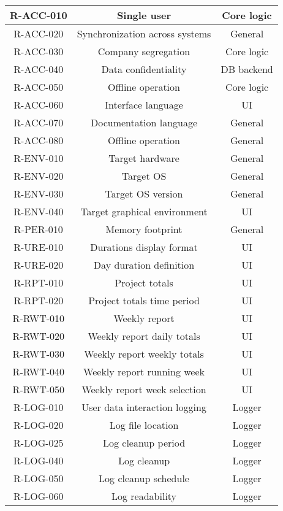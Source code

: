 \begin{longtable}{| c | c | c |}
  R-ACC-010 & Single user & Core logic \\ \hline
  R-ACC-020 & Synchronization across systems & General \\ \hline
  R-ACC-030 & Company segregation & Core logic \\ \hline
  R-ACC-040 & Data confidentiality & DB backend \\ \hline
  R-ACC-050 & Offline operation & Core logic \\ \hline
  R-ACC-060 & Interface language & UI \\ \hline
  R-ACC-070 & Documentation language & General \\ \hline
  R-ACC-080 & Offline operation & General \\ \hline
  R-ENV-010 & Target hardware & General \\ \hline
  R-ENV-020 & Target OS & General \\ \hline
  R-ENV-030 & Target OS version & General \\ \hline
  R-ENV-040 & Target graphical environment & UI \\ \hline
  R-PER-010 & Memory footprint & General \\ \hline
  R-URE-010 & Durations display format & UI \\ \hline
  R-URE-020 & Day duration definition & UI \\ \hline
  R-RPT-010 & Project totals & UI \\ \hline
  R-RPT-020 & Project totals time period & UI \\ \hline
  R-RWT-010 & Weekly report & UI \\ \hline
  R-RWT-020 & Weekly report daily totals & UI \\ \hline
  R-RWT-030 & Weekly report weekly totals & UI \\ \hline
  R-RWT-040 & Weekly report running week & UI \\ \hline
  R-RWT-050 & Weekly report week selection & UI \\ \hline
  R-LOG-010 & User data interaction logging & Logger \\ \hline
  R-LOG-020 & Log file location & Logger \\ \hline
  R-LOG-025 & Log cleanup period & Logger \\ \hline
  R-LOG-040 & Log cleanup & Logger \\ \hline
  R-LOG-050 & Log cleanup schedule & Logger \\ \hline
  R-LOG-060 & Log readability & Logger \\ \hline

\end{longtable}
